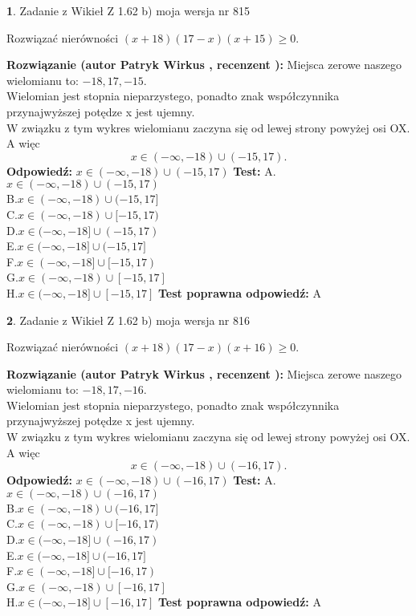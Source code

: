 \documentclass[12pt, a4paper]{article}
\theoremstyle{definition} %
\newtheorem{zad}{}
\newcommand{\zadStart}[1]{\begin{zad}#1\newline}
\newcommand{\zadStop}{\end{zad}}
\newcommand{\rozwStart}[2]{\noindent \textbf{Rozwiązanie (autor #1 , recenzent #2): }\newline}
\newcommand{\rozwStop}{\newline}
\newcommand{\odpStart}{\noindent \textbf{Odpowiedź:}\newline}
\newcommand{\odpStop}{\newline}
\newcommand{\testStart}{\noindent \textbf{Test:}\newline}
\newcommand{\testStop}{\newline}
\newcommand{\kluczStart}{\noindent \textbf{Test poprawna odpowiedź:}\newline}
\newcommand{\kluczStop}{\newline}
\begin{document}
\zadStart{Zadanie z Wikieł Z 1.62 b) moja wersja nr 815}

Rozwiązać nierówności $(x+18)(17-x)(x+15)\ge0$.
\zadStop
\rozwStart{Patryk Wirkus}{}
Miejsca zerowe naszego wielomianu to: $-18, 17, -15$.\\
Wielomian jest stopnia nieparzystego, ponadto znak współczynnika przy\linebreak najwyższej potędze x jest ujemny.\\ W związku z tym wykres wielomianu zaczyna się od lewej strony powyżej osi OX. A więc $$x \in (-\infty,-18) \cup (-15,17).$$
\rozwStop
\odpStart
$x \in (-\infty,-18) \cup (-15,17)$
\odpStop
\testStart
A.$x \in (-\infty,-18) \cup (-15,17)$\\
B.$x \in (-\infty,-18) \cup (-15,17]$\\
C.$x \in (-\infty,-18) \cup [-15,17)$\\
D.$x \in (-\infty,-18] \cup (-15,17)$\\
E.$x \in (-\infty,-18] \cup (-15,17]$\\
F.$x \in (-\infty,-18] \cup [-15,17)$\\
G.$x \in (-\infty,-18) \cup [-15,17]$\\
H.$x \in (-\infty,-18] \cup [-15,17]$
\testStop
\kluczStart
A
\kluczStop



\zadStart{Zadanie z Wikieł Z 1.62 b) moja wersja nr 816}

Rozwiązać nierówności $(x+18)(17-x)(x+16)\ge0$.
\zadStop
\rozwStart{Patryk Wirkus}{}
Miejsca zerowe naszego wielomianu to: $-18, 17, -16$.\\
Wielomian jest stopnia nieparzystego, ponadto znak współczynnika przy\linebreak najwyższej potędze x jest ujemny.\\ W związku z tym wykres wielomianu zaczyna się od lewej strony powyżej osi OX. A więc $$x \in (-\infty,-18) \cup (-16,17).$$
\rozwStop
\odpStart
$x \in (-\infty,-18) \cup (-16,17)$
\odpStop
\testStart
A.$x \in (-\infty,-18) \cup (-16,17)$\\
B.$x \in (-\infty,-18) \cup (-16,17]$\\
C.$x \in (-\infty,-18) \cup [-16,17)$\\
D.$x \in (-\infty,-18] \cup (-16,17)$\\
E.$x \in (-\infty,-18] \cup (-16,17]$\\
F.$x \in (-\infty,-18] \cup [-16,17)$\\
G.$x \in (-\infty,-18) \cup [-16,17]$\\
H.$x \in (-\infty,-18] \cup [-16,17]$
\testStop
\kluczStart
A
\kluczStop
\end{document}
